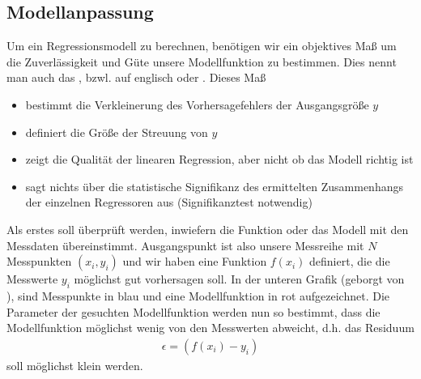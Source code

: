 \documentclass[letterpaper,10pt,english]{jupyterBook}
\begin{document}
\sphinxAtStartPar
{}


\subsection{Modellanpassung }
\label{\detokenize{content/1_Kurvenanpassung:modellanpassung-a-id-sec-modellanpassung-a}}
\sphinxAtStartPar
Um ein Regressionsmodell zu berechnen, benötigen wir ein objektives Maß um die Zuverlässigkeit und Güte unsere Modellfunktion zu bestimmen. Dies nennt man auch das , bzwl. auf englisch  oder . Dieses Maß
\begin{itemize}
\item {} 
\sphinxAtStartPar
bestimmt die Verkleinerung des Vorhersagefehlers der Ausgangsgröße \(y\)

\item {} 
\sphinxAtStartPar
definiert die Größe der Streuung von \(y\)

\item {} 
\sphinxAtStartPar
zeigt die Qualität der linearen Regression, aber nicht ob das Modell richtig ist

\item {} 
\sphinxAtStartPar
sagt nichts über die statistische Signifikanz des ermittelten Zusammenhangs der einzelnen Regressoren aus (Signifikanztest notwendig)

\end{itemize}

\sphinxAtStartPar
Als erstes soll überprüft werden, inwiefern die Funktion oder das Modell mit den Messdaten übereinstimmt. Ausgangspunkt ist also unsere Messreihe mit \(N\) Messpunkten \((x_i, y_i)\) und wir haben eine Funktion \(f(x_i)\) definiert, die die Messwerte \(y_i\) möglichst gut vorhersagen soll. In der unteren Grafik (geborgt von ), sind Messpunkte in blau und eine Modellfunktion in rot aufgezeichnet. Die Parameter der gesuchten Modellfunktion werden nun so bestimmt, dass die Modellfunktion möglichst wenig von den Messwerten abweicht, d.h. das Residuum
\begin{equation*}
\begin{split}\epsilon = \left( f(x_i) - y_i\right)\end{split}
\end{equation*}
\sphinxAtStartPar
soll möglichst klein werden.
\end{document}
